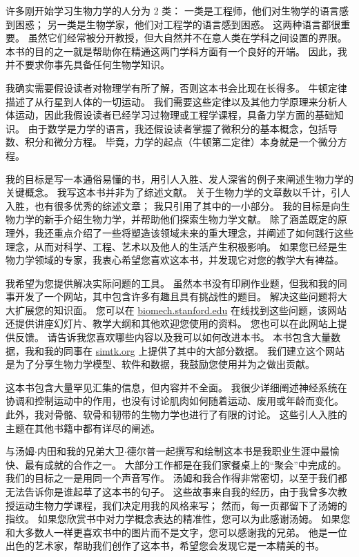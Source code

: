 \documentclass[cn,10pt,citestyle=gb7714-2015, bibstyle=gb7714-2015]{elegantbook}
\begin{document}
许多刚开始学习生物力学的人分为 2 类：
一类是工程师，他们对生物学的语言感到困惑；
另一类是生物学家，他们对工程学的语言感到困惑。
这两种语言都很重要。
虽然它们经常被分开教授，但大自然并不在意人类在学科之间设置的界限。
本书的目的之一就是帮助你在精通这两门学科方面有一个良好的开端。
因此，我并不要求你事先具备任何生物学知识。


我确实需要假设读者对物理学有所了解，否则这本书会比现在长得多。
牛顿定律描述了从行星到人体的一切运动。
我们需要这些定律以及其他力学原理来分析人体运动，因此我假设读者已经学习过物理或工程学课程，具备力学方面的基础知识。
由于数学是力学的语言，我还假设读者掌握了微积分的基本概念，包括导数、积分和微分方程。
毕竟，力学的起点（牛顿第二定律）本身就是一个微分方程。


我的目标是写一本通俗易懂的书，用引人入胜、发人深省的例子来阐述生物力学的关键概念。
我写这本书并非为了综述文献。
关于生物力学的文章数以千计，引人入胜，也有很多优秀的综述文章；
我只引用了其中的一小部分。
我的目标是向生物力学的新手介绍生物力学，并帮助他们探索生物力学文献。
除了涵盖既定的原理外，我还重点介绍了一些将塑造该领域未来的重大理念，并阐述了如何践行这些理念，从而对科学、工程、艺术以及他人的生活产生积极影响。
如果您已经是生物力学领域的专家，我衷心希望您喜欢这本书，并发现它对您的教学大有裨益。


我希望为您提供解决实际问题的工具。
虽然本书没有印刷作业题，但我和我的同事开发了一个网站，其中包含许多有趣且具有挑战性的题目。
解决这些问题将大大扩展您的知识面。
您可以在 \href{biomech.stanford.edu}{biomech.stanford.edu} 在线找到这些问题，该网站还提供讲座幻灯片、教学大纲和其他欢迎您使用的资料。
您也可以在此网站上提供反馈。
请告诉我您喜欢哪些内容以及我可以如何改进本书。
本书包含大量数据，我和我的同事在 \href{simtk.org}{simtk.org} 上提供了其中的大部分数据。
我们建立这个网站是为了分享生物力学模型、软件和数据，我鼓励您使用并为之做出贡献。


这本书包含大量罕见汇集的信息，但内容并不全面。
我很少详细阐述神经系统在协调和控制运动中的作用，也没有讨论肌肉如何随着运动、废用或年龄而变化。
此外，我对骨骼、软骨和韧带的生物力学也进行了有限的讨论。
这些引人入胜的主题在其他书籍中都有详尽的阐述。


与汤姆$\cdot$内田和我的兄弟大卫$\cdot$德尔普一起撰写和绘制这本书是我职业生涯中最愉快、最有成就的合作之一。
大部分工作都是在我们家餐桌上的“聚会”中完成的。
我们的目标之一是用同一个声音写作。
汤姆和我合作得非常密切，以至于我们都无法告诉你是谁起草了这本书的句子。
这些故事来自我的经历，由于我曾多次教授运动生物力学课程，我们决定用我的风格来写；
然而，每一页都留下了汤姆的指纹。
如果您欣赏书中对力学概念表达的精准性，您可以为此感谢汤姆。
如果您和大多数人一样更喜欢书中的图片而不是文字，您可以感谢我的兄弟。
他是一位出色的艺术家，帮助我们创作了这本书，希望您会发现它是一本精美的书。
\end{document}
